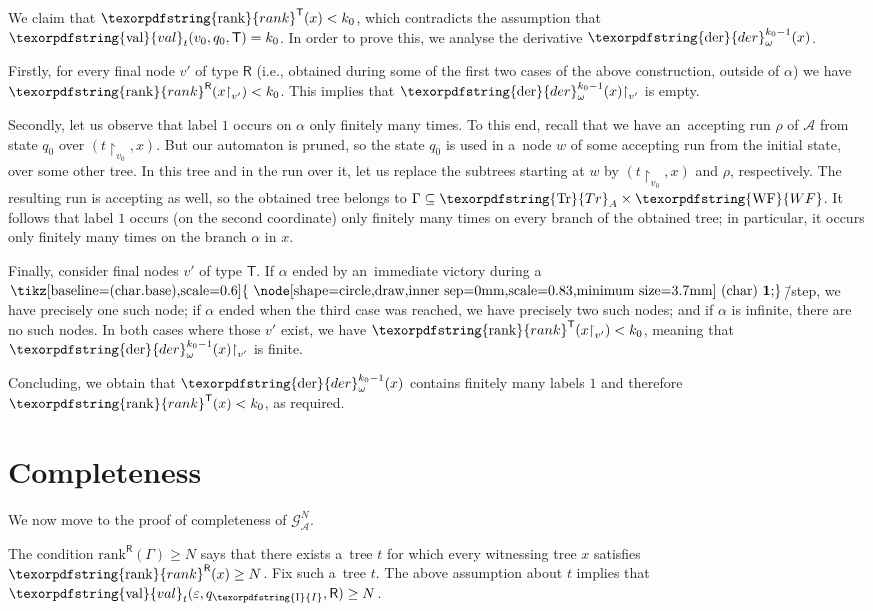 \documentclass[11pt,a4paper]{amsart}
\theoremstyle{plain}
\theoremstyle{definition}
\theoremstyle{defC}
\theoremstyle{thmC}
\theoremstyle{plain}
\numberwithin{equation}{section}
\numberwithin{equation}{section}
\numberwithin{figure}{section}
\newcommand{\ident}[1]{\ensuremath{\texorpdfstring{\mathrm{\mathnm{#1}}}{#1}}\xspace}
\newcommand{\mathcalsym}[1]{\ensuremath{\mathcal{#1}}\xspace}
\newcommand{\CA}{\mathcalsym{A}}
\newcommand{\CG}{\mathcalsym{G}}
\newcommand{\mathnm}[1]{#1}
\newcommand{\restr}{{\upharpoonright}}
\newcommand{\init}{\ident{I}}
\newcommand{\trees}{\ident{Tr}}
\newcommand{\val}{\ident{val}}
\newcommand{\WF}{\ident{WF}}
\newcommand{\der}{\ident{der}}
\newcommand{\sT}{\mathsf{T}}
\newcommand{\sR}{\mathsf{R}}
\newcommand{\rankR}{\ident{rank}^\sR}
\newcommand{\rankT}{\ident{rank}^\sT}
\renewcommand\epsilon\varepsilon
\newcommand*\circled[1]{\tikz[baseline=(char.base),scale=0.6]{
            \node[shape=circle,draw,inner sep=0mm,scale=0.83,minimum size=3.7mm] (char) {\textbf{#1}};}}
\newcommand{\fg}{\mathbf{\text{\circled{1}}}}
\newcommand{\derF}{\der_\omega}
\newcommand{\limitF}{\mathrm{rank}^{\sR}}
\begin{document}
We claim that $\rankT(x)< k_0$, which contradicts the assumption that $\val_t(v_0,q_0,\sT)=k_0$.
In order to prove this, we analyse the derivative $\derF^{k_0-1}(x)$.

Firstly, for every final node $v'$ of type $\sR$ (i.e., obtained during some of the first two cases of the above construction, outside of $\alpha$) we have $\rankR(x\restr_{v'})<k_0$.
This implies that $\derF^{k_0-1}(x)\restr_{v'}$ is empty.

Secondly, let us observe that label $1$ occurs on $\alpha$ only finitely many times.
To this end, recall that we have an~accepting run $\rho$ of $\CA$ from state $q_0$ over $(t\restr_{v_0},x)$.
But our automaton is pruned, so the state $q_0$ is used in a~node $w$ of some accepting run from the initial state, over some other tree.
In this tree and in the run over it, let us replace the subtrees starting at $w$ by $(t\restr_{v_0},x)$ and $\rho$, respectively.
The resulting run is accepting as well, so the obtained tree belongs to $\Gamma\subseteq\trees_A\times\WF$.
It follows that label $1$ occurs (on the second coordinate) only finitely many times on every branch of the obtained tree;
in particular, it occurs only finitely many times on the branch $\alpha$ in $x$.

Finally, consider final nodes $v'$ of type $\sT$.
If $\alpha$ ended by an~immediate victory during a~$\fg$\=/step, we have precisely one such node;
if $\alpha$ ended when the third case was reached, we have precisely two such nodes;
and if $\alpha$ is infinite, there are no such nodes.
In both cases where those $v'$ exist, we have $\rankT(x\restr_{v'})<k_0$, meaning that $\derF^{k_0-1}(x)\restr_{v'}$ is finite.

Concluding, we obtain that $\derF^{k_0-1}(x)$ contains finitely many labels $1$ and therefore $\rankT(x)<k_0$, as required.



\section{Completeness}
\label{sec:completeness}

We now move to the proof of completeness of $\CG^N_\CA$.

\lemCompleteness*

\noindent %
The condition $\limitF(\Gamma)\geq N$ says that there exists a~tree $t$ for which every witnessing tree $x$ satisfies $\rankR(x)\geq N$.
Fix such a~tree $t$.
The above assumption about $t$ implies that $\val_t(\epsilon,q_\init,\sR)\geq N$.
\end{document}
